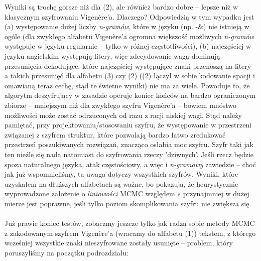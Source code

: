 \documentclass[a4paper]{article}
\theoremstyle{defn}
\theoremstyle{theorem}
\theoremstyle{lemma}
\theoremstyle{cor}
\theoremstyle{fact}
\begin{document}
Wyniki są trochę gorsze niż dla (2), ale również bardzo dobre – lepsze niż w klasycznym szyfrowaniu Vigenère'a. Dlaczego? Odpowiedzią w tym wypadku jest (a) występowanie dużej liczby \textit{n-gramów}, które w języku (np. -\&) nie istnieją w ogóle (dla zwykłego alfabetu Vigenère'a ogromna większość możliwych \textit{n-gramów} występuje w języku regularnie – tylko w różnej częstotliwości), (b) najczęściej w języku angielskim występują litery, więc zdecydowanie wagą dominują przesunięcia dekodujące, które najczęściej występujące znaki przenoszą na litery – a takich przesunięć dla alfabetu (3) czy (2) ((2) łączył w sobie kodowanie spacji i omawianą teraz cechę, stąd te świetne wyniki) nie ma za wiele. Powoduje to, że algorytm deszyfrujący w zasadzie operuje koniec końców na bardzo ograniczonym zbiorze – mniejszym niż dla zwykłego szyfru Vigenère'a – bowiem mnóstwo możliwości może zostać odrzuconych od razu z racji niskiej wagi. Stąd należy pamiętać, przy projektowaniu/stosowaniu szyfru, że występowanie w przestrzeni związanej z szyfrem struktur, które pozwalają bardzo łatwo zredukować przestrzeń poszukiwanych rozwiązań, znacząco osłabia moc szyfru. Szyfr taki jak ten nieźle się nada natomiast do szyfrowania rzeczy 'dziwnych'. Jeśli rzecz będzie spoza naturalnego języka, atak częstościowy, a więc i \textit{n-gramowy} zawiedzie – choć jak już wspomnieliśmy, ta uwaga dotyczy wszystkich szyfrów. Wyniki, które uzyskałem na dłuższych alfabetach są ważne, bo pokazują, że heurystycznie wyprowadzone założenie o \textit{liniowości} MCMC względem $s$ przynajmniej w dużej mierze jest poprawne, jeśli tylko poziom skomplikowania szyfru nie zwiększa się.\\\\
Już prawie koniec testów, zobaczmy jeszcze tylko jak radzą sobie metody MCMC z zakodowanym szyfrem Vigenère'a (wracamy do alfabetu (1)) tekstem, z którego wcześniej wszystkie znaki nieszyfrowane zostały usunięte – problem, który poruszyliśmy na początku podrozdziału:\\
\end{document}
